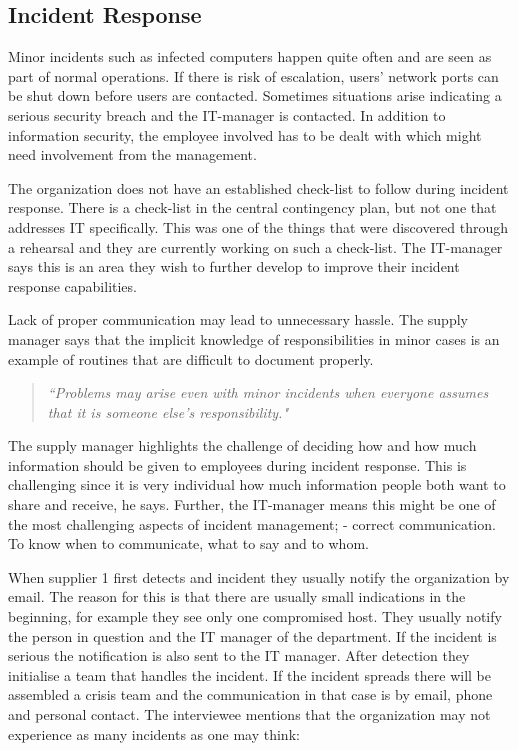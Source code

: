 \subsection{Incident Response}
Minor incidents such as infected computers happen quite often and are seen as part of normal operations. If there is risk of escalation, users' network ports can be shut down before users are contacted. Sometimes situations arise indicating a serious security breach and the IT-manager is contacted. In addition to information security, the employee involved has to be dealt with which might need involvement from the management.

The organization does not have an established check-list to follow during incident response. There is a check-list in the central contingency plan, but not one that addresses IT specifically. This was one of the things that were discovered through a rehearsal and they are currently working on such a check-list. The IT-manager says this is an area they wish to further develop to improve their incident response capabilities. 

Lack of proper communication may lead to unnecessary hassle. The supply manager says that the implicit knowledge of responsibilities in minor cases is an example of routines that are difficult to document properly.
\begin{quote}
\textit{``Problems may arise even with minor incidents when everyone assumes that it is someone else's responsibility."}
\end{quote}

The supply manager highlights the challenge of deciding how and how much information should be given to employees during incident response. This is challenging since it is very individual how much information people both want to share and receive, he says. Further, the IT-manager means this might be one of the most challenging aspects of incident management; - correct communication. To know when to communicate, what to say and to whom. 

When supplier 1 first detects and incident they usually notify the organization by email. The reason for this is that there are usually small indications in the beginning, for example they see only one compromised host. They usually notify the person in question and the IT manager of the department. If the incident is serious the notification is also sent to the IT manager. After detection they initialise a team that handles the incident. If the incident spreads there will be assembled a crisis team and the communication in that case is by email, phone and personal contact. The interviewee mentions that the organization may not experience as many incidents as one may think:

